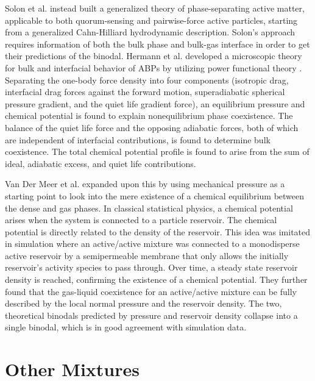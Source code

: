 \documentclass[11pt]{article}
\begin{document}
Solon et al. \cite{Solon2} instead built a generalized theory of phase-separating active matter, applicable to both quorum-sensing and pairwise-force active particles, starting from a generalized Cahn-Hilliard hydrodynamic description.  Solon's approach requires information of both the bulk phase and bulk-gas interface in order to get their predictions of the binodal. Hermann et al. \cite{Hermann} developed a microscopic theory for bulk and interfacial behavior of ABPs by utilizing power functional theory \cite{Schmidt}.  Separating the one-body force density into four components (isotropic drag, interfacial drag forces against the forward motion, superadiabatic spherical pressure gradient, and the quiet life gradient force), an equilibrium pressure and chemical potential is found to explain nonequilibrium phase coexistence.  The balance of the quiet life force and the opposing adiabatic forces, both of which are independent of interfacial contributions, is found to determine bulk coexistence.  The total chemical potential profile is found to arise from the sum of ideal, adiabatic excess, and quiet life contributions.

Van Der Meer et al. \cite{Van} expanded upon this by using mechanical pressure as a starting point to look into the mere existence of a chemical equilibrium between the dense and gas phases.  In classical statistical physics, a chemical potential arises when the system is connected to a particle reservoir.  The chemical potential is directly related to the density of the reservoir.  This idea was imitated in simulation where an active/active mixture was connected to a monodisperse active reservoir by a semipermeable membrane that only allows the initially reservoir's activity species to pass through.  Over time, a steady state reservoir density is reached, confirming the existence of a chemical potential.  They further found that the gas-liquid coexistence for an active/active mixture can be fully described by the local normal pressure and the reservoir density.  The two, theoretical binodals predicted by pressure and reservoir density collapse into a single binodal, which is in good agreement with simulation data.


\section{Other Mixtures}
\end{document}
